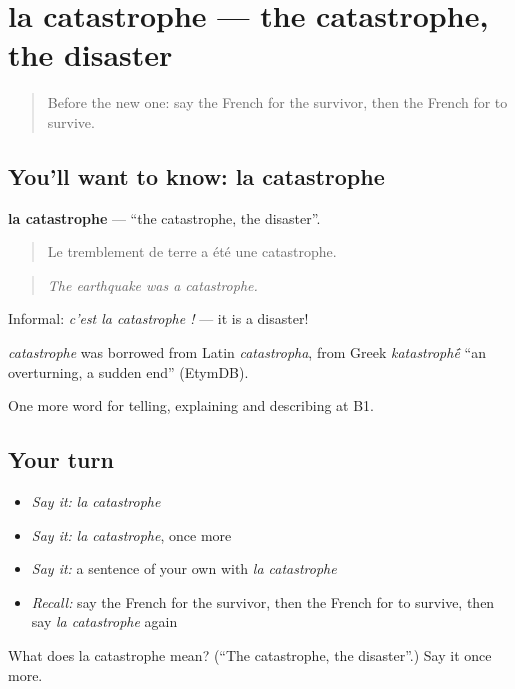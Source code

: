 \section[la catastrophe]{la catastrophe — the catastrophe, the disaster}

\label{lesson:FR-C305-catastrophe}



\begin{quote}
Before the new one: say the French for the survivor, then the French for to survive.
\end{quote}

\subsection*{You'll want to know: la catastrophe}
\textbf{la catastrophe} — \textquotedblleft{}the catastrophe, the disaster\textquotedblright{}.

\begin{quote}
Le tremblement de terre a été une catastrophe.
\end{quote}

\begin{quote}
\emph{The earthquake was a catastrophe.}
\end{quote}

Informal: \emph{c'est la catastrophe !} — it is a disaster!

\begin{cousinweb}
\emph{catastrophe} was borrowed from Latin \emph{catastropha}, from Greek \emph{katastroph\'{\={e}}} \textquotedblleft{}an overturning, a sudden end\textquotedblright{} (EtymDB).
\end{cousinweb}

\begin{grammarlens}[title={What you've built}]
One more word for telling, explaining and describing at B1.
\end{grammarlens}

\subsection*{Your turn}
\begin{itemize}
\raggedright
  \item \emph{Say it:} \emph{la catastrophe}
  \item \emph{Say it:} \emph{la catastrophe}, once more
  \item \emph{Say it:} a sentence of your own with \emph{la catastrophe}
  \item \emph{Recall:} say the French for the survivor, then the French for to survive, then say \emph{la catastrophe} again
\end{itemize}

\begin{tcolorbox}[breakable,colback=teal!4,colframe=teal!35!black,title={Before you move on}]
What does la catastrophe mean? (\textquotedblleft{}The catastrophe, the disaster\textquotedblright{}.) Say it once more.
\end{tcolorbox}

